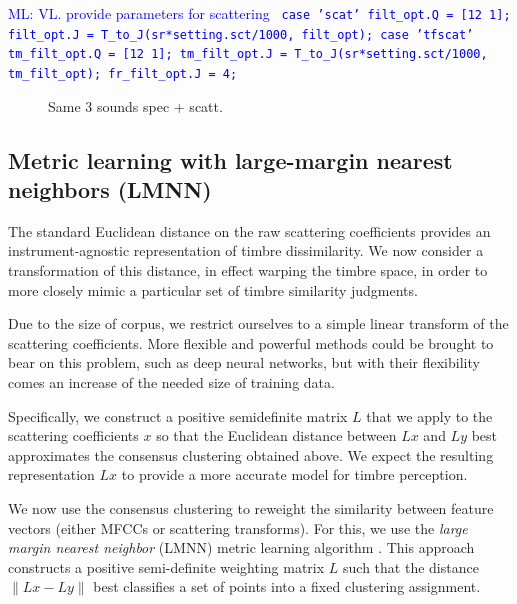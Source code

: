 \documentclass{bmcart}
\newcommand{\ml}[1]{\textcolor{blue}{ML: #1}\xspace}
\begin{document}
\ml{VL. provide parameters for scattering
\texttt{
case 'scat'
    filt\_opt.Q = [12 1];
    filt\_opt.J = T\_to\_J(sr*setting.sct/1000, filt\_opt);
case 'tfscat'
    tm\_filt\_opt.Q = [12 1];
    tm\_filt\_opt.J = T\_to\_J(sr*setting.sct/1000, tm\_filt\_opt);
    fr\_filt\_opt.J = 4;}}

\begin{figure}
\caption{
Same 3 sounds spec + scatt.
}
\end{figure}

\subsection*{Metric learning with large-margin nearest neighbors (LMNN)}
\label{sec:weighting}

The standard Euclidean distance on the raw scattering coefficients provides an instrument-agnostic representation of timbre dissimilarity.
We now consider a transformation of this distance, in effect warping the timbre space, in order to more closely mimic a particular set of timbre similarity judgments.

Due to the size of corpus, we restrict ourselves to a simple linear transform of the scattering coefficients. More flexible and powerful methods could be brought to bear on this problem, such as deep neural networks, but with their flexibility comes an increase of the needed size of training data.

Specifically, we construct a positive semidefinite matrix $L$ that we apply to the scattering coefficients $x$ so that the Euclidean distance between $Lx$ and $Ly$ best approximates the consensus clustering obtained above.
We expect the resulting representation $Lx$ to provide a more accurate model for timbre perception.

We now use the consensus clustering to reweight the similarity between feature vectors (either MFCCs or scattering transforms).
For this, we use the \emph{large margin nearest neighbor} (LMNN) metric learning algorithm \cite{weinberger2006distance, weinberger2009distance}.
This approach constructs a positive semi-definite weighting matrix $L$ such that the distance $\|Lx - Ly\|$ best classifies a set of points into a fixed clustering assignment.
\end{document}
